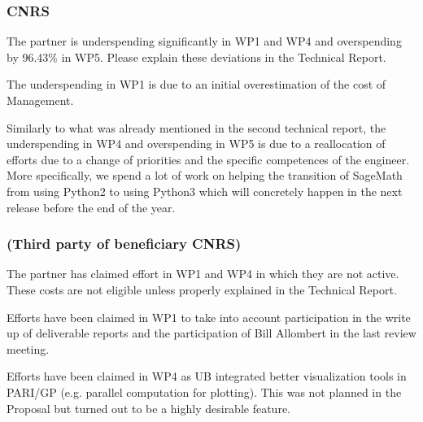 \subsubsection{CNRS}
\begin{EUcomment}
  The partner is underspending significantly in WP1 and WP4 and
  overspending by 96.43\% in WP5. Please explain these deviations in
  the Technical Report.
\end{EUcomment}
The underspending in WP1 is due to an initial overestimation of the
cost of Management.

Similarly to what was already mentioned in the second technical report, the
underspending in WP4 and overspending in WP5 is due to a reallocation of
efforts due to a change of priorities and the specific competences of the
engineer. More specifically, we spend a lot of work on helping the transition
of SageMath from using Python2 to using Python3 which will concretely happen
in the next release before the end of the year.

\subsubsection{ (Third party of beneficiary CNRS)}

\begin{EUcomment}
  The partner has claimed effort in WP1 and WP4 in which they are not
  active. These costs are not eligible unless properly explained in
  the Technical Report.
\end{EUcomment}
Efforts have been claimed in WP1 to take into account participation in
the write up of deliverable reports and
the participation of Bill Allombert in the last review meeting.

Efforts have been claimed in WP4 as UB integrated better visualization tools in
PARI/GP (e.g. parallel computation for plotting). This was not planned in the
Proposal but turned out to be a highly desirable feature.

\subsubsection{}

